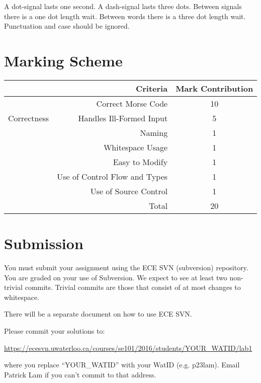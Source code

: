 \documentclass{article}
\begin{document}
A dot-signal lasts one second.  A dash-signal lasts three dots.  Between signals there is a one dot length wait.  Between words there is a three dot length wait.  Punctuation and case should be ignored.


\section*{Marking Scheme}
\begin{center}
\begin{tabular}[c]{cr|c}
&\textbf{Criteria} & \textbf{Mark Contribution} \\ \hline
\multirow{3}{*}{Correctness} 
	& Correct Morse Code & 10 \\
	& Handles Ill-Formed Input & 5 \\

\multirow{4}{*}{Style} 
	& Naming & 1 \\
    	& Whitespace Usage & 1 \\
	& Easy to Modify & 1 \\
	& Use of Control Flow and Types & 1 \\
	& Use of Source Control & 1 \\ \hhline{==|=}
	
& Total & 20 \\ 
\end{tabular}
\end{center}

\section*{Submission}
You must submit your assignment using the ECE SVN (subversion) repository.  You are graded on your use of Subversion.  We expect to see at least two non-trivial commits. Trivial commits are those that consist of at most changes to whitespace.

There will be a separate document on how to use ECE SVN.

Please commit your solutions to:

\begin{center}
\url{https://ecesvn.uwaterloo.ca/courses/se101/2016/students/YOUR\_WATID/lab1}
\end{center}

where you replace ``YOUR\_WATID'' with your WatID (e.g. p23lam). Email Patrick Lam if you can't commit to that address.
\end{document}
